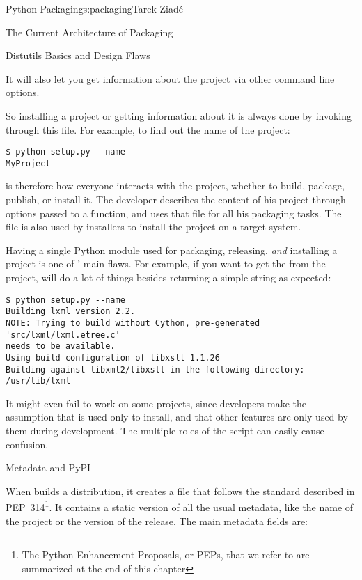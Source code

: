 \begin{aosachapter}{Python Packaging}{s:packaging}{Tarek Ziad\'{e}}
\begin{aosasect1}{The Current Architecture of Packaging}
\begin{aosasect2}{Distutils Basics and Design Flaws}
\begin{aosaitemize}
\end{aosaitemize}

\noindent
It will also let you get information about the project via other
command line options.

So installing a project or getting information about it is always done
by invoking  through this file. For example, to find
out the name of the project:

\begin{verbatim}
$ python setup.py --name
MyProject
\end{verbatim}

\noindent {} is therefore how everyone interacts with the project,
whether to build, package, publish, or install it. The developer
describes the content of his project through options passed to a
function, and uses that file for all his packaging tasks. The file is
also used by installers to install the project on a target system.


Having a single Python module used for packaging, releasing,
\emph{and} installing a project is one of ' main
flaws.  For example, if you want to get the  from the 
project,  will do a lot of things besides returning a
simple string as expected:

\begin{verbatim}
$ python setup.py --name
Building lxml version 2.2.
NOTE: Trying to build without Cython, pre-generated 'src/lxml/lxml.etree.c'
needs to be available.
Using build configuration of libxslt 1.1.26
Building against libxml2/libxslt in the following directory: /usr/lib/lxml
\end{verbatim}

\noindent It might even fail to work on some projects, since
developers make the assumption that  is used only to
install, and that other  features are only used by
them during development.  The multiple roles of the 
script can easily cause confusion.

\end{aosasect2}

\begin{aosasect2}{Metadata and PyPI}

When  builds a distribution, it creates a
 file that follows the standard described in
PEP~314\footnote{The Python Enhancement Proposals, or PEPs, that we
refer to are summarized at the end of this chapter}.  It contains a
static version of all the usual metadata, like the name of the project
or the version of the release.  The main metadata fields are:


\end{aosasect2}
\end{aosasect1}
\end{aosachapter}
